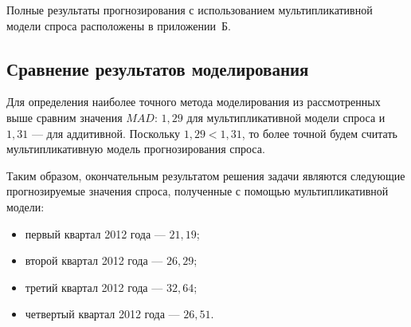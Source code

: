 Полные результаты прогнозирования с использованием мультипликативной
модели спроса расположены в приложении~Б.


\subsection{Сравнение результатов моделирования}

Для определения наиболее точного метода моделирования из рассмотренных
выше сравним значения \( MAD \):
$1{,}29$ для мультипликативной модели спроса и
$1{,}31$ --- для аддитивной.
Поскольку \( 1{,}29 < 1{,}31 \), то более точной будем считать
мультипликативную модель прогнозирования спроса.

Таким образом, окончательным результатом решения задачи являются следующие
прогнозируемые значения спроса,
полученные с помощью мультипликативной модели:

\begin{itemize}
  \item первый квартал 2012 года --- $21{,}19$;
  \item второй квартал 2012 года --- $26{,}29$;
  \item третий квартал 2012 года --- $32{,}64$;
  \item четвертый квартал 2012 года --- $26{,}51$.
\end{itemize}
